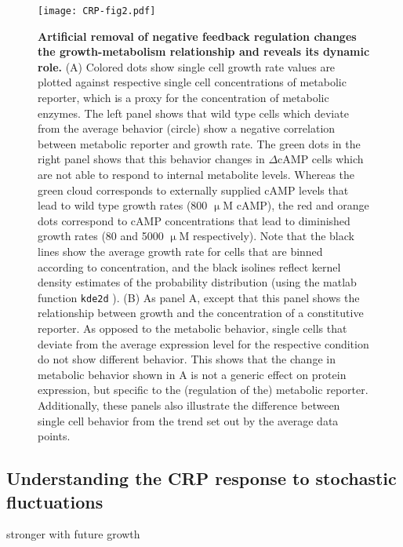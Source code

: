 \begin{figure}
	\centering
	\texttt{[image: CRP-fig2.pdf]}
	\caption{ 
		\textbf{Artificial removal of negative feedback regulation changes the growth-metabolism relationship and reveals its dynamic role.}		
		(A) Colored dots show single cell growth rate values are plotted against respective single cell concentrations of metabolic reporter, which is a proxy for the concentration of metabolic enzymes. 
		The left panel shows that wild type cells which deviate from the average behavior (circle) show a negative correlation between metabolic reporter and growth rate.
		The green dots in the right panel shows that this behavior changes in $\Delta$cAMP cells which are not able to respond to internal metabolite levels. 
		Whereas the green cloud corresponds to externally supplied cAMP levels that lead to wild type growth rates (800 $\upmu$M cAMP), the 
		red and orange dots correspond to cAMP concentrations that lead to diminished growth rates (80 and 5000 $\upmu$M respectively).		
		Note that the black lines show the average growth rate for cells that are binned according to concentration, and the black isolines reflect kernel density estimates of the probability distribution (using the matlab function \texttt{kde2d} \cite{Botev2010}).
		(B) As panel A, except that this panel shows the relationship between growth and the concentration of a constitutive reporter. 
		As opposed to the metabolic behavior, single cells that deviate from the average expression level for the respective condition do not show  different behavior.
		This shows that the change in metabolic behavior shown in A is not a generic effect on protein expression, but specific to the (regulation of the) metabolic reporter.
		Additionally, these panels also illustrate the difference between single cell behavior from the trend set out by the average data points.
	}
	\label{fig:CRP:fig2}
\end{figure}


\subsection*{Understanding the CRP response to stochastic fluctuations}





stronger with future growth

